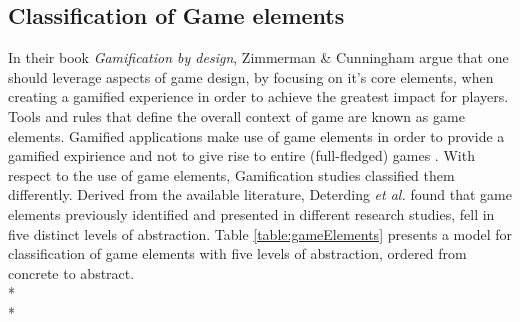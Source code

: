 \subsection{Classification of Game elements}

In their book \textit{Gamification by design}, Zimmerman \& Cunningham argue that one should leverage aspects of game design, by focusing on it's core elements, when creating a gamified experience in order to achieve the
greatest impact for players. Tools and rules that define the overall context of game are known as game elements. %
Gamified  applications  make use of game elements in order to provide a gamified expirience and not to give rise to entire (full-fledged) games \cite{deterding2011game}. With respect to the use of game elements, Gamification studies classified them differently. Derived from the available literature, Deterding \textit{et al.} found that game elements previously identified and presented in different research studies, fell in five distinct levels of abstraction. Table \ref{table:gameElements} presents a model for classification of game elements with five levels of abstraction, ordered from concrete to abstract.\\*\\*
